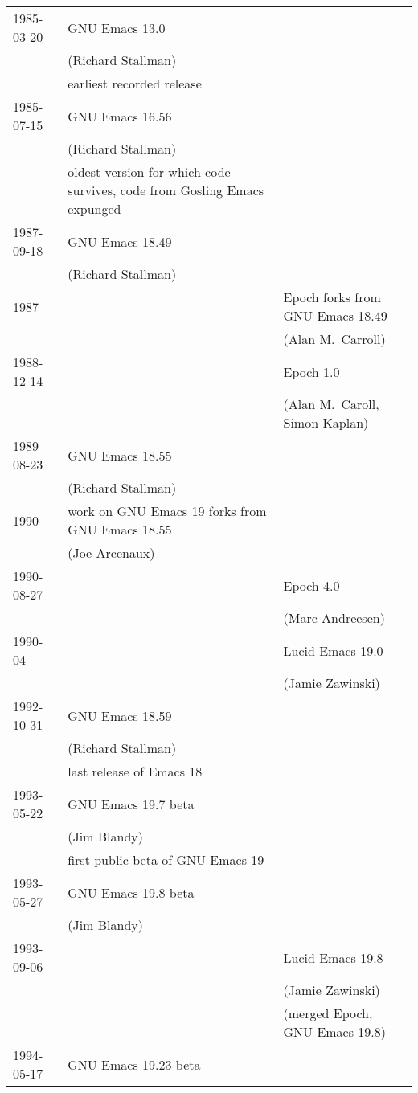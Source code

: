 \documentclass[format=acmsmall, review]{acmart}
\begin{document}
\begin{center}
  \begin{longtabu} to \textwidth {l|X|X}
    1985-03-20 & GNU Emacs 13.0 \\
    & (Richard Stallman)\\
    & earliest recorded release\\[1ex]
    1985-07-15 & GNU Emacs 16.56 \\
    & (Richard Stallman)\\
    & oldest version for which code survives, code from Gosling Emacs expunged\\[1ex]
    1987-09-18 & GNU Emacs 18.49\\
    & (Richard Stallman)\\[1ex]
    1987 & & Epoch forks from GNU Emacs 18.49\\
    && (Alan M.\ Carroll)\\[1ex]
    1988-12-14 & & Epoch 1.0\\
    & & (Alan M.\ Caroll, Simon Kaplan)\\[1ex]
    1989-08-23 & GNU Emacs 18.55\\
    & (Richard Stallman)\\[1ex]
    1990 & work on GNU Emacs 19 forks from GNU Emacs 18.55\\
    & (Joe Arcenaux)\\[1ex]
    1990-08-27 & & Epoch 4.0\\
    && (Marc Andreesen)\\[1ex]
    1990-04 && Lucid Emacs 19.0 \\
    && (Jamie Zawinski)\\[1ex]
    1992-10-31 & GNU Emacs 18.59 \\
    & (Richard Stallman)\\
    & last release of Emacs 18\\[1ex]
    1993-05-22 & GNU Emacs 19.7 beta\\
    & (Jim Blandy)\\
    & first public beta of GNU Emacs 19\\[1ex]
    1993-05-27 & GNU Emacs 19.8 beta\\
    & (Jim Blandy)\\
    1993-09-06 & & Lucid Emacs 19.8\\
    & & (Jamie Zawinski)\\
    & & (merged Epoch, GNU Emacs 19.8)\\[1ex]
    1994-05-17 & GNU Emacs 19.23 beta\\

\end{longtabu}
\end{center}
\end{document}
